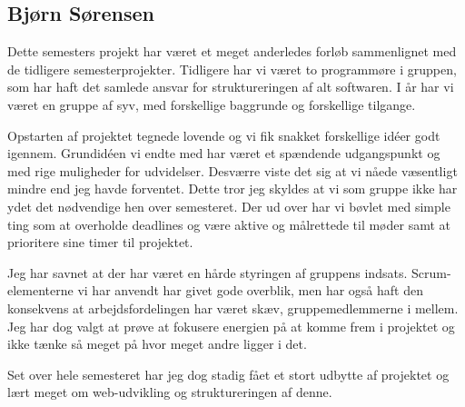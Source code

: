 \subsection*{Bjørn Sørensen}
Dette semesters projekt har været et meget anderledes forløb sammenlignet med de tidligere semesterprojekter. Tidligere har vi været to programmøre i gruppen, som har haft det samlede ansvar for struktureringen af alt softwaren. I år har vi været en gruppe af syv, med forskellige baggrunde og forskellige tilgange.

Opstarten af projektet tegnede lovende og vi fik snakket forskellige idéer godt igennem. Grundidéen vi endte med har været et spændende udgangspunkt og med rige muligheder for udvidelser. Desværre viste det sig at vi nåede væsentligt mindre end jeg havde forventet. Dette tror jeg skyldes at vi som gruppe ikke har ydet det nødvendige hen over semesteret. Der ud over har vi bøvlet med simple ting som at overholde deadlines og være aktive og målrettede til møder samt at prioritere sine timer til projektet.

Jeg har savnet at der har været en hårde styringen af gruppens indsats. Scrum-elementerne vi har anvendt har givet gode overblik, men har også haft den konsekvens at arbejdsfordelingen har været skæv, gruppemedlemmerne i mellem. Jeg har dog valgt at prøve at fokusere energien på at komme frem i projektet og ikke tænke så meget på hvor meget andre ligger i det.

Set over hele semesteret har jeg dog stadig fået et stort udbytte af projektet og lært meget om web-udvikling og struktureringen af denne.